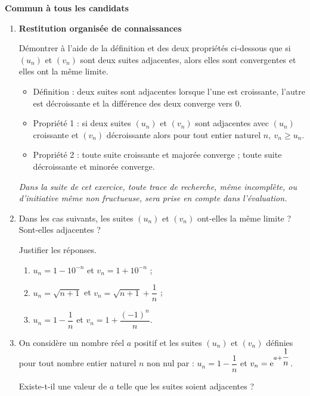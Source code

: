 \textbf{Commun à tous les candidats}

\medskip

\begin{enumerate}
\item \textbf{Restitution organisée de connaissances}

\medskip
 
Démontrer à l'aide de la définition et des deux propriétés ci-dessous que si 
$\left(u_{n}\right)$ et $\left(v_{n}\right)$ sont deux suites adjacentes, alors elles sont convergentes et elles ont la même limite.

\setlength\parindent{5mm}
\begin{itemize}
\item[] Définition : deux suites sont adjacentes lorsque l'une est croissante, l'autre est décroissante et la différence des deux converge vers $0$. 
\item[] Propriété 1 : si deux suites $\left(u_{n}\right)$ et $\left(v_{n}\right)$ sont adjacentes avec $\left(u_{n}\right)$ croissante et $\left(v_{n}\right)$ décroissante alors pour tout entier naturel $n,~ v_{n} \geqslant u_{n}$. 
\item[] Propriété 2 : toute suite croissante et majorée converge ; toute suite décroissante et minorée converge.
\end{itemize}
\setlength\parindent{0mm}
 
\emph{Dans la suite de cet exercice, toute trace de recherche, même incomplète, ou d'initiative même non fructueuse, sera prise en compte dans l'évaluation.}
 
\item Dans les cas suivants, les suites $\left(u_{n}\right)$ et $\left(v_{n}\right)$ ont-elles la même limite ? Sont-elles adjacentes ? 

Justifier les réponses. 
	\begin{enumerate}
		\item $u_{n} = 1 - 10^{-n}$ et $v_{n} = 1 + 10^{-n}$ ;
		\item $u_{n} = \sqrt{n + 1}$ et $v_{n} = \sqrt{n + 1} + \dfrac{1}{n}$ ; 
		\item $u_{n} = 1 -  \dfrac{1}{n}$ et  $v_{n} = 1 +  \dfrac{(-1)^n}{n}$. 
	\end{enumerate}
\item On considère un nombre réel $a$ positif et les suites $\left(u_{n}\right)$ et $\left(v_{n}\right)$ 
définies pour tout nombre entier naturel $n$ non nul par : $u_{n} = 1 - \dfrac{1}{n}$ et $v_{n} =  \mathrm{e}^{  a + \dfrac{1}{n}}$.

Existe-t-il une valeur de $a$ telle que les suites soient adjacentes ? 
\end{enumerate}